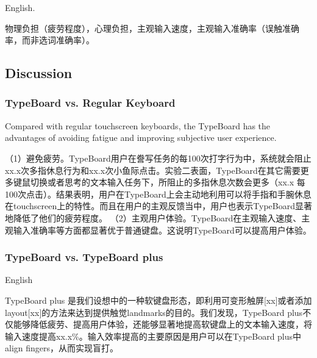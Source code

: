 English.

物理负担（疲劳程度），心理负担，主观输入速度，主观输入准确率（误触准确率，而非选词准确率）。

\subsection{Discussion}

\subsubsection{TypeBoard vs. Regular Keyboard}

Compared with regular touchscreen keyboards, the TypeBoard has the advantages of avoiding fatigue and improving subjective user experience.

（1）避免疲劳。TypeBoard用户在誊写任务的每100次打字行为中，系统就会阻止xx.x次多指休息行为和xx.x次小鱼际点击。实验二表面，TypeBoard在其它需要更多键鼠切换或者思考的文本输入任务下，所阻止的多指休息次数会更多（xx.x 每100次点击）。结果表明，用户在TypeBoard上会主动地利用可以将手指和手腕休息在touchscreen上的特性。而且在用户的主观反馈当中，用户也表示TypeBoard显著地降低了他们的疲劳程度。
（2）主观用户体验。TypeBoard在主观输入速度、主观输入准确率等方面都显著优于普通键盘。这说明TypeBoard可以提高用户体验。

\subsubsection{TypeBoard vs. TypeBoard plus}

English

TypeBoard plus 是我们设想中的一种软键盘形态，即利用可变形触屏[xx]或者添加layout[xx]的方法来达到提供触觉landmarks的目的。我们发现，TypeBoard plus不仅能够降低疲劳、提高用户体验，还能够显著地提高软键盘上的文本输入速度，将输入速度提高xx.x\%。输入效率提高的主要原因是用户可以在TypeBoard plus中align fingers，从而实现盲打。
